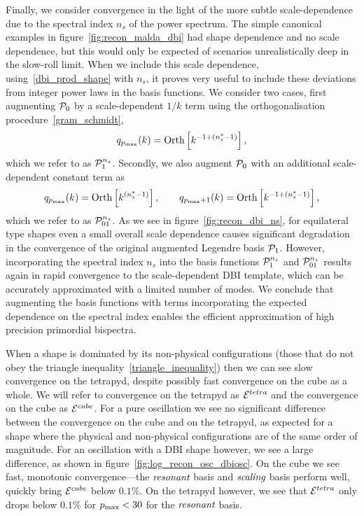 Finally, we consider convergence in the light of the more subtle scale-dependence due to the spectral index $n_s$ of the power spectrum.  The simple canonical examples in figure~\ref{fig:recon_malda_dbi} had shape dependence and no scale dependence, but this would only be expected of scenarios unrealistically deep in the slow-roll limit.
When we include this scale dependence, using~\eqref{dbi_prod_shape} with $n_s$, 
it proves very useful to include these deviations from
integer power laws in the basis functions.  We consider two cases, first augmenting $\mathcal{P}_0$ by a scale-dependent $1/k$ term using the orthogonalisation procedure~\eqref{gram_schmidt}, 
\begin{align}\label{Lns_inv}
    q_{p_\text{max}}(k) = \text{Orth}\left[{k^{-1+(n_s^{*}-1)}}\right],
\end{align}
which we refer to as $\mathcal{P}^{n_s}_1$.
Secondly, we also augment $\mathcal{P}_0$ with an additional scale-dependent constant term as 
\begin{align}\label{Lns_both}
    q_{p_\text{max}}(k) = \text{Orth}\left[{k^{(n_s^{*}-1)}}\right],\qquad  q_{p_\text{max}\text{$+$}1}(k) = \text{Orth}\left[{k^{-1+(n_s^{*}-1)}}\right],
\end{align}
which we refer to as $\mathcal{P}^{n_s}_{01}$.
As we see in figure~\ref{fig:recon_dbi_ns}, for equilateral type shapes
even a small overall scale dependence causes significant degradation in the convergence of the original augmented Legendre basis $\mathcal{P}_1$.
However, incorporating the spectral index $n_s$  into the basis functions $\mathcal{P}^{n_s}_1$ and $\mathcal{P}^{n_s}_{01}$ results again in rapid convergence to the scale-dependent DBI template, which can be accurately approximated with a limited number of modes.
We conclude that augmenting the basis functions with terms incorporating the expected dependence on the spectral index enables the efficient approximation of high precision primordial bispectra.


    When a shape is dominated by its non-physical configurations
    (those that do not obey the triangle inequality~\eqref{triangle_inequality})
    then we can see slow convergence on the tetrapyd, despite
    possibly fast convergence on the cube as a whole.
    We will refer to convergence on the tetrapyd as $\mathcal{E}^{tetra}$
    and the convergence on the cube as $\mathcal{E}^{cube}$.
    For a pure oscillation we see no significant difference between the convergence on the cube
    and on the tetrapyd, as expected for a shape where the physical and non-physical
    configurations are of the same order of magnitude.
    For an oscillation with a DBI shape however, we see a large difference,
    as shown in figure~\ref{fig:log_recon_osc_dbiosc}.
    On the cube we see fast, monotonic convergence---the $\textit{resonant}$ basis
    and $\textit{scaling}$ basis perform well, quickly bring $\mathcal{E}^{cube}$
    below $0.1\%$.
    On the tetrapyd however, we see that $\mathcal{E}^{tetra}$ only drops below
    $0.1\%$ for $p_\text{max}<30$ for the $\textit{resonant}$ basis.


